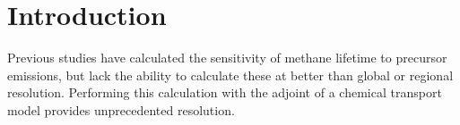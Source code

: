 \section{Introduction}

Previous studies have calculated the sensitivity of methane lifetime to precursor emissions\cite{ref:holmes2013}, but lack the ability to calculate these at better than global or regional resolution. Performing this calculation with the adjoint of a chemical transport model provides unprecedented resolution.